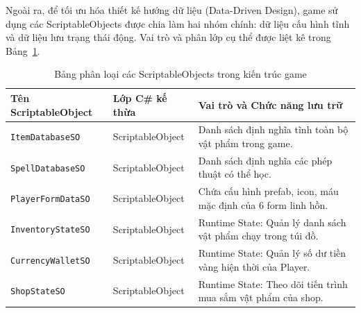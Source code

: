 \documentclass[../DoAn.tex]{subfiles}
\begin{document}
Ngoài ra, để tối ưu hóa thiết kế hướng dữ liệu (Data-Driven Design), game sử dụng các ScriptableObjects được chia làm hai nhóm chính: dữ liệu cấu hình tĩnh và dữ liệu lưu trạng thái động. Vai trò và phân lớp cụ thể được liệt kê trong Bảng~\ref{table:scriptable_objects}.

\begin{table}[H]
\centering
\begin{tabular}{|p{4.5cm}|p{3.5cm}|p{6.0cm}|}
\hline
\textbf{Tên ScriptableObject} & \textbf{Lớp C\# kế thừa} & \textbf{Vai trò và Chức năng lưu trữ} \\ \hline
\texttt{ItemDatabaseSO} & ScriptableObject & Danh sách định nghĩa tĩnh toàn bộ vật phẩm trong game. \\ \hline
\texttt{SpellDatabaseSO} & ScriptableObject & Danh sách định nghĩa các phép thuật có thể học. \\ \hline
\texttt{PlayerFormDataSO} & ScriptableObject & Chứa cấu hình prefab, icon, máu mặc định của 6 form linh hồn. \\ \hline
\texttt{InventoryStateSO} & ScriptableObject & Runtime State: Quản lý danh sách vật phẩm chạy trong túi đồ. \\ \hline
\texttt{CurrencyWalletSO} & ScriptableObject & Runtime State: Quản lý số dư tiền vàng hiện thời của Player. \\ \hline
\texttt{ShopStateSO} & ScriptableObject & Runtime State: Theo dõi tiến trình mua sắm vật phẩm của shop. \\ \hline
\end{tabular}
\caption{Bảng phân loại các ScriptableObjects trong kiến trúc game}
\label{table:scriptable_objects}
\end{table}
\end{document}

